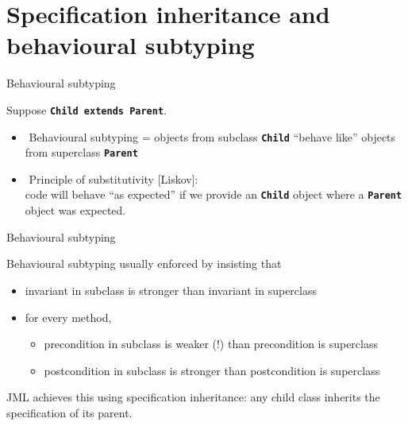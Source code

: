 \documentclass[
pdf,
nocolorBG,
slideColor,
erik,
]{prosper}
\newcommand{\code}[1]{{\rm \texttt{\textbf{\small #1}}}}
\newif\ifignore
\begin{document}
\ifignore 
\part{{\Large \red Specification inheritance and behavioural subtyping }}

\begin{slide}{Behavioural subtyping}
\vspace*{-3ex}

Suppose \code{Child extends Parent}.

\begin{itemize}
\item $\!$ {\green Behavioural subtyping} =
objects from subclass \code{Child} ``behave like'' 
objects from superclass \code{Parent}
\item $\!$ {\green Principle of substitutivity} [Liskov]:\\
code will behave ``as expected'' if we provide an
\code{Child} object where a \code{Parent} object was expected. 
\end{itemize}

\end{slide}

\begin{slide}{Behavioural subtyping}
\vspace*{-3ex}

Behavioural subtyping usually enforced by insisting that

\begin{itemize}
\item 
invariant in subclass is {\green stronger} than invariant in superclass
\item
for every method,
\begin{itemize}
\item 
precondition in subclass is {\blue weaker} (!) than precondition is superclass
\item 
postcondition in subclass is {\green stronger} than postcondition is superclass
\end{itemize}
\end{itemize}

JML achieves this using {\green specification inheritance}:
any child class {\green inherits} the specification of its parent.

\end{slide}
\end{document}
